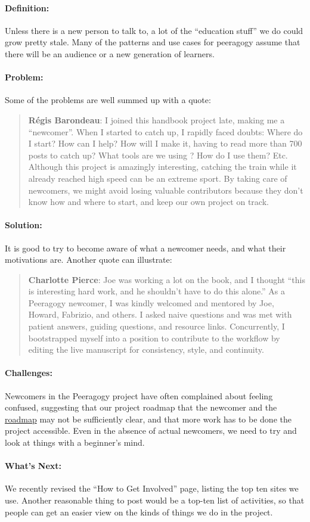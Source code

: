 
\paragraph{Definition:} Unless there is a new person to talk to, a lot of
the ``education stuff'' we do could grow pretty stale. Many of the
patterns and use cases for peeragogy assume that there will be an
audience or a new generation of learners.

\paragraph{Problem:} Some of the problems are well summed up with a quote:

\begin{quote}
\textbf{Régis Barondeau}: I joined this handbook project late, making me
a ``newcomer''. When I started to catch up, I rapidly faced doubts:
Where do I start? How can I help? How will I make it, having to read
more than 700 posts to catch up? What tools are we using ? How do I use
them? Etc. Although this project is amazingly interesting, catching the
train while it already reached high speed can be an extreme sport. By
taking care of newcomers, we might avoid losing valuable contributors
because they don't know how and where to start, and keep our own project
on track.
\end{quote}

\paragraph{Solution:} It is good to try to become aware of what a newcomer
needs, and what their motivations are. Another quote can illustrate:

\begin{quote}
\textbf{Charlotte Pierce}: Joe was working a lot on the book, and I
thought ``this is interesting hard work, and he shouldn't have to do
this alone.'' As a Peeragogy newcomer, I was kindly welcomed and
mentored by Joe, Howard, Fabrizio, and others. I asked naive questions
and was met with patient answers, guiding questions, and resource links.
Concurrently, I bootstrapped myself into a position to contribute to the
workflow by editing the live manuscript for consistency, style, and
continuity.
\end{quote}

\paragraph{Challenges:} Newcomers in the Peeragogy project have often
complained about feeling confused, suggesting that our project roadmap
that the newcomer and
the \href{http://peeragogy.org/practice/roadmap/}{roadmap} may not be
sufficiently clear, and that more work has to be done the project
accessible. Even in the absence of actual newcomers, we need to try and
look at things with a beginner's mind.

\paragraph{What's Next:} We recently revised the ``How to Get Involved''
page, listing the top ten sites we use. Another reasonable thing to post
would be a top-ten list of activities, so that people can get an easier
view on the kinds of things we do in the project.
